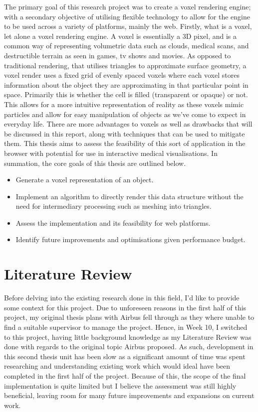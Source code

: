 \documentclass[titlepage]{article}
\begin{document}
The primary goal of this research project was to create a voxel rendering engine; with a secondary objective of utilising flexible technology to allow for the engine to be used across a variety of platforms, mainly the web. Firstly, what is a voxel, let alone a voxel rendering engine. A voxel is essentially a 3D pixel, and is a common way of representing volumetric data such as clouds, medical scans, and destructible terrain as seen in games, tv shows and movies. As opposed to traditional rendering, that utilises triangles to approximate surface geometry, a voxel render uses a fixed grid of evenly spaced voxels where each voxel stores information about the object they are approximating in that particular point in space. Primarily this is whether the cell is filled (transparent or opaque) or not. This allows for a more intuitive representation of reality as these voxels mimic particles and allow for easy manipulation of objects as we've come to expect in everyday life. There are more advantages to voxels as well as drawbacks that will be discussed in this report, along with techniques that can be used to mitigate them. This thesis aims to assess the feasibility of this sort of application in the browser with potential for use in interactive medical visualisations. In summation, the core goals of this thesis are outlined below.

\begin{itemize}
  \item Generate a voxel representation of an object.
  \item Implement an algorithm to directly render this data structure without the need for intermediary processing such as meshing into triangles.
  \item Assess the implementation and its feasibility for web platforms.
  \item Identify future improvements and optimisations given performance budget.
\end{itemize}

\section{Literature Review}

Before delving into the existing research done in this field, I'd like to provide some context for this project. Due to unforeseen reasons in the first half of this project, my original thesis plans with Airbus fell through as they where unable to find a suitable supervisor to manage the project. Hence, in Week 10, I switched to this project, having little background knowledge as my Literature Review was done with regards to the original topic Airbus proposed. As such, development in this second thesis unit has been slow as a significant amount of time was spent researching and understanding existing work which would ideal have been completed in the first half of the project. Because of this, the scope of the final implementation is quite limited but I believe the assessment was still highly beneficial, leaving room for many future improvements and expansions on current work.
\end{document}

